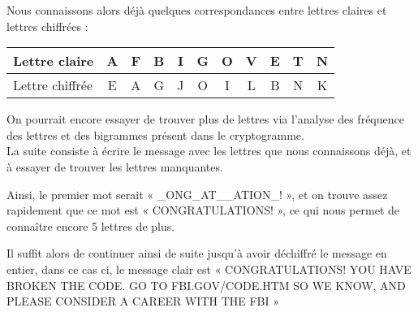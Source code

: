 Nous connaissons alors déjà quelques correspondances entre lettres
claires et lettres chiffrées : \\
\begin{center}
  \begin{tabular}{|l|c|c|c|c|c|c|c|c|c|c|}
    \hline
    Lettre claire & A & F & B & I & G & O & V & E & T & N \\
    \hline
    Lettre chiffrée & E & A & G & J & O & I & L & B & N & K \\
    \hline
  \end{tabular}
\end{center}
%
On pourrait encore essayer de trouver plus de lettres via
l'analyse des fréquence des lettres et des bigrammes présent dans
le cryptogramme.
\\

La suite consiste à écrire le message avec les lettres que nous
connaissons déjà, et à essayer de trouver les lettres manquantes.

Ainsi, le premier mot serait « \_ONG\_AT\_\_ATION\_! », et on trouve
assez rapidement que ce mot est « CONGRATULATIONS! », ce qui nous
permet de connaître encore 5 lettres de plus.

Il suffit alors de continuer ainsi de suite jusqu'à avoir
déchiffré le message en entier, dans ce cas ci, le message clair
est « CONGRATULATIONS! YOU HAVE BROKEN THE CODE. GO TO
FBI.GOV/CODE.HTM SO WE KNOW, AND PLEASE CONSIDER A CAREER WITH THE
FBI »
